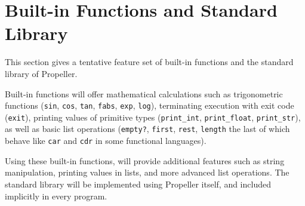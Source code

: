 \section{Built-in Functions and Standard Library}

This section gives a tentative feature set of built-in functions and the standard library of
Propeller.

Built-in functions will offer mathematical calculations such as trigonometric functions
(\verb|sin|, \verb|cos|, \verb|tan|, \verb|fabs|, \verb|exp|, \verb|log|),
terminating execution with exit code (\verb|exit|), printing values of primitive types
(\verb|print_int|, \verb|print_float|, \verb|print_str|),
as well as basic list operations (\verb|empty?|, \verb|first|, \verb|rest|, \verb|length| the last of which
behave like \verb|car| and \verb|cdr| in some functional languages).

Using these built-in functions, will provide additional features such as
string manipulation, printing values in lists, and more advanced list operations. The standard
library will be implemented using Propeller itself, and included implicitly in every program.
